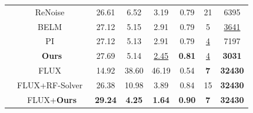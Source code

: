 \documentclass{article}
\begin{document}
\begin{table}[t]
{\begin{tabular}{@{}cccccccc@{}}
\multicolumn{1}{c|}{}                                      & \multicolumn{1}{c|}{ReNoise~\cite{garibi2024renoise}}             & 26.61   & 6.52   & 3.19   & \multicolumn{1}{c|}{0.79}  & 21                      & 6395                \\
\multicolumn{1}{c|}{}                                      & \multicolumn{1}{c|}{BELM~\cite{wang2024belm}}           & 27.12   & 5.15   & 2.91   & \multicolumn{1}{c|}{0.79}  & 5                      & \underline{3641}                \\
\multicolumn{1}{c|}{}                                      & \multicolumn{1}{c|}{PI~\cite{ju2024pnp}}             & 27.12   & 5.13   & 2.91   & \multicolumn{1}{c|}{0.79}  & \underline{4}                      & 7197                \\
\multicolumn{1}{c|}{}                                      & \multicolumn{1}{c|}{\textbf{Ours}}           & 27.69   & 5.14   & \underline{2.45}   & \multicolumn{1}{c|}{\textbf{0.81}}  & \underline{4}                      & \textbf{3031}                \\ \hdashline
\multicolumn{1}{c|}{\multirow{3}{*}{\textbf{DiT Based}}}   & \multicolumn{1}{c|}{FLUX~\cite{flux}}           & 14.92   & 38.60  & 46.19  & \multicolumn{1}{c|}{0.54}  & \textbf{7}                      & \textbf{32430}               \\
\multicolumn{1}{c|}{}                                      & \multicolumn{1}{c|}{FLUX+RF-Solver~\cite{wang2024taming}} & 26.38   & 10.98  & 3.89   & \multicolumn{1}{c|}{0.84}  & 15                     & \textbf{32430}               \\
\multicolumn{1}{c|}{}                                      & \multicolumn{1}{c|}{FLUX+\textbf{Ours}}      & \textbf{29.24}   & \textbf{4.25}   & \textbf{1.64}   & \multicolumn{1}{c|}{\textbf{0.90}}  & \textbf{7}                      & \textbf{32430}               \\ \bottomrule
\end{tabular}}\\
\end{table}
\end{document}
